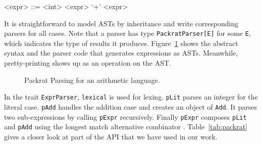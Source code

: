 \setlength{\grammarindent}{5em}
\begin{grammar}
<expr> ::= <int>
    \alt <expr> `+' <expr>
\end{grammar}

It is straightforward to model ASTs by inheritance and write corresponding parsers for all cases.
Note that a parser has type \lstinline{PackratParser[E]} for some
\lstinline{E}, which indicates the type of results it produces. Figure~\ref{fig:packrat-arith} shows the abstract syntax and
the parser code that generates expressions as ASTs. Meanwhile, pretty-printing shows up as an operation on the AST.

\begin{figure}[t]
\centering
\caption{Packrat Parsing for an arithmetic language.}\label{fig:packrat-arith}
\end{figure}


In the trait \lstinline{ExprParser}, \lstinline{lexical} is used for lexing. \lstinline{pLit} parses an integer for the literal case.
\lstinline{pAdd} handles the addition case and creates an object of \lstinline{Add}. It parses two sub-expressions by calling \lstinline{pExpr}
recursively. Finally \lstinline{pExpr} composes \lstinline{pLit} and \lstinline{pAdd} using the longest match alternative combinator \inlinecode{|||}.
Table~\ref{tab:packrat} gives a closer look at part of the API that we have used in our work.

